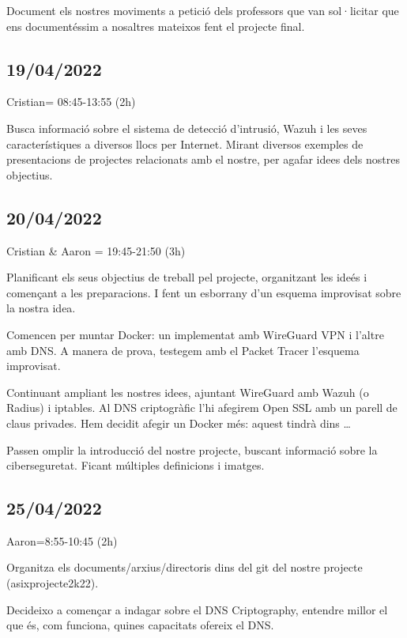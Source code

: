 \documentclass[]{article}
\begin{document}
Document els nostres moviments a petició dels professors que van
sol·licitar que ens documentéssim a nosaltres mateixos fent el projecte
final.

\hypertarget{section}{%
\subsection{19/04/2022}\label{section}}

Cristian= 08:45-13:55 (2h)

Busca informació sobre el sistema de detecció d'intrusió, Wazuh i les
seves característiques a diversos llocs per Internet. Mirant diversos
exemples de presentacions de projectes relacionats amb el nostre, per
agafar idees dels nostres objectius.

\hypertarget{section-1}{%
\subsection{20/04/2022}\label{section-1}}

Cristian \& Aaron = 19:45-21:50 (3h)

Planificant els seus objectius de treball pel projecte, organitzant les
ideés i començant a les preparacions. I fent un esborrany d'un esquema
improvisat sobre la nostra idea.

Comencen per muntar Docker: un implementat amb WireGuard VPN i l'altre
amb DNS. A manera de prova, testegem amb el Packet Tracer l'esquema
improvisat.

Continuant ampliant les nostres idees, ajuntant WireGuard amb Wazuh (o
Radius) i iptables. Al DNS criptogràfic l'hi afegirem Open SSL amb un
parell de claus privades. Hem decidit afegir un Docker més: aquest
tindrà dins \ldots{}

Passen omplir la introducció del nostre projecte, buscant informació
sobre la ciberseguretat. Ficant múltiples definicions i imatges.

\hypertarget{section-2}{%
\subsection{25/04/2022}\label{section-2}}

Aaron=8:55-10:45 (2h)

Organitza els documents/arxius/directoris dins del git del nostre
projecte (asixprojecte2k22).

Decideixo a començar a indagar sobre el DNS Criptography, entendre
millor el que és, com funciona, quines capacitats ofereix el DNS.
\end{document}
